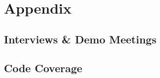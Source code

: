 \cleardoublepage
{}
\part*{Appendix}
\chapter{Interviews \& Demo Meetings}
\label{app:interview}









\chapter{Code Coverage}





